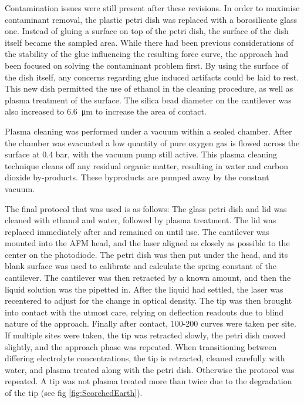 Contamination issues were still present after these revisions. In order to maximise contaminant removal, the plastic petri dish was replaced with a borosilicate glass one. Instead of gluing a surface on top of the petri dish, the surface of the dish itself became the sampled area. While there had been previous considerations of the stability of the glue influencing the resulting force curve, the approach had been focused on solving the contaminant problem first. By using the surface of the dish itself, any concerns regarding glue induced artifacts could be laid to rest. This new dish permitted the use of ethanol in the cleaning procedure, as well as plasma treatment of the surface. The silica bead diameter on the cantilever was also increased to \SI{6.6}{\micro\metre} to increase the area of contact. 


Plasma cleaning was performed under a vacuum within a sealed chamber. After the chamber was evacuated a low quantity of pure oxygen gas is flowed across the surface at 0.4 bar, with the vacuum pump still active. This plasma cleaning technique cleans off any residual organic matter, resulting in water and carbon dioxide by-products. These byproducts are pumped away by the constant vacuum. \cite{PlasUV} \cite{PlasTreat} \cite{SilicaAFMCleaning}



The final protocol that was used is as follows: The glass petri dish and lid was cleaned with ethanol and water, followed by plasma treatment. The lid was replaced immediately after and remained on until use. The cantilever was mounted into the AFM head, and the laser aligned as closely as possible to the center on the photodiode. The petri dish was then put under the head, and its blank surface was used to calibrate and calculate the spring constant of the cantilever. The cantilever was then retracted by a known amount, and then the liquid solution was the pipetted in. After the liquid had settled, the laser was recentered to adjust for the change in optical density. The tip was then brought into contact with the utmost care, relying on deflection readouts due to blind nature of the approach. Finally after contact, 100-200 curves were taken per site. If multiple sites were taken, the tip was retracted slowly, the petri dish moved slightly, and the approach phase was repeated. When transitioning between differing electrolyte concentrations, the tip is retracted, cleaned carefully with water, and plasma treated along with the petri dish. Otherwise the protocol was repeated. A tip was not plasma treated more than twice due to the degradation of the tip (see fig \ref{fig:ScorchedEarth}).

